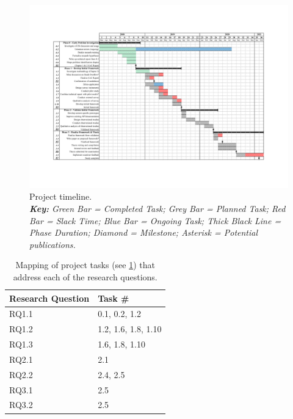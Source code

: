 \begin{landscape}


\begin{figure}[p!]
  \vspace{-0.5cm}
  \centering
  \includegraphics[width=\linewidth]{work-plan}
  \caption[PhD project timeline]{Project timeline. \\ \textit{\textbf{Key:} Green Bar = Completed Task; Grey Bar = Planned Task; Red Bar = Slack Time; Blue Bar = Ongoing Task; Thick Black Line = Phase Duration; Diamond = Milestone; Asterisk = Potential publications.}}
  \label{fig:project-status:work-plan}
\end{figure}
  
\end{landscape}

\begin{table}
\centering
\caption[Mapping of project tasks to research questions]{Mapping of project tasks (see \cref{fig:project-status:work-plan})  that address each of the research questions.}
\begin{tabular}{@{}l|l@{}}
\toprule
  \textbf{Research Question} &
  \textbf{Task \#} \\
  \midrule
    RQ1.1 & 0.1, 0.2, 1.2 \\
    RQ1.2 & 1.2, 1.6, 1.8, 1.10 \\
    RQ1.3 & 1.6, 1.8, 1.10 \\
    RQ2.1 & 2.1 \\
    RQ2.2 & 2.4, 2.5 \\
    RQ3.1 & 2.5 \\
    RQ3.2 & 2.5 \\
  \bottomrule
\end{tabular}
\end{table}


